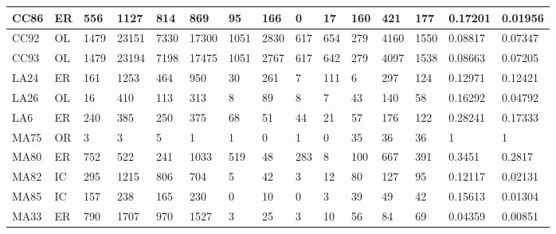 \begin{landscape}
\begin{table}[]
\begin{tabular}{|l|l|l|l|l|l|l|l|l|l|l|l|l|l|l|}
		CC86         &       ER              & 556   & 1127   & 814    & 869    & 95    & 166   & 0   & 17  & 160                     & 421          & 177         & 0.17201         & 0.01956        \\ \hline
		CC92         &       OL              & 1479  & 23151  & 7330   & 17300  & 1051  & 2830  & 617 & 654 & 279                     & 4160         & 1550        & 0.08817         & 0.07347        \\ \hline
		CC93         &       OL              & 1479  & 23194  & 7198   & 17475  & 1051  & 2767  & 617 & 642 & 279                     & 4097         & 1538        & 0.08663         & 0.07205        \\ \hline
		LA24            &       ER              & 161   & 1253   & 464    & 950    & 30    & 261   & 7   & 111 & 6                       & 297          & 124         & 0.12971         & 0.12421        \\ \hline
		LA26            &       OL              & 16    & 410    & 113    & 313    & 8     & 89    & 8   & 7   & 43                      & 140          & 58          & 0.16292         & 0.04792        \\ \hline
		LA6             &       ER              & 240   & 385    & 250    & 375    & 68    & 51    & 44  & 21  & 57                      & 176          & 122         & 0.28241         & 0.17333        \\ \hline
		MA75             &       OR              & 3     & 3      & 5      & 1      & 1     & 0     & 1   & 0   & 35                      & 36           & 36          & 1               & 1              \\ \hline
		MA80             &       ER              & 752   & 522    & 241    & 1033   & 519   & 48    & 283 & 8   & 100                     & 667          & 391         & 0.3451          & 0.2817         \\ \hline
		MA82             &       IC              & 295   & 1215   & 806    & 704    & 5     & 42    & 3   & 12  & 80                      & 127          & 95          & 0.12117         & 0.02131        \\ \hline
		MA85             &       IC              & 157   & 238    & 165    & 230    & 0     & 10    & 0   & 3   & 39                      & 49           & 42          & 0.15613         & 0.01304        \\ \hline
		MA33            &       ER              & 790   & 1707   & 970    & 1527   & 3     & 25    & 3   & 10  & 56                      & 84           & 69          & 0.04359         & 0.00851        \\ \hline

\end{tabular}
\end{table}
\end{landscape}
